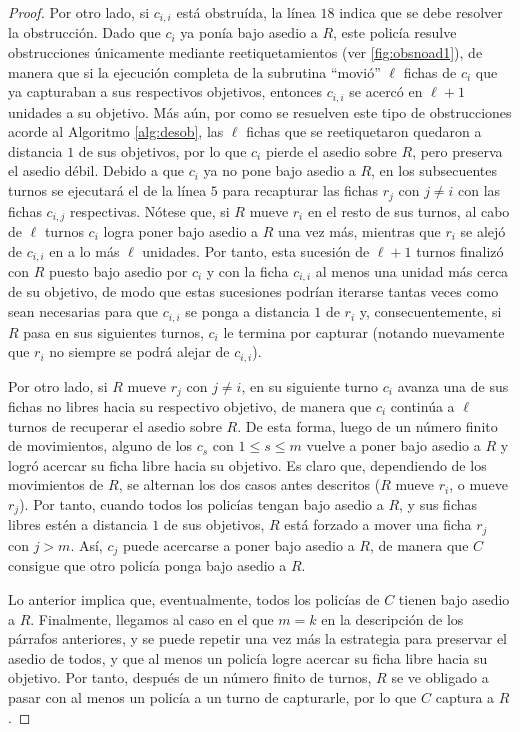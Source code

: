 \begin{proof}
    Por otro lado, si $c_{i,i}$ est\'a obstru\'ida, la l\'inea $18$ indica que
    se debe resolver la obstrucci\'on. Dado que $c_i$ ya pon\'ia bajo asedio a
    $R$, este polic\'ia resulve obstrucciones \'unicamente mediante
    reetiquetamientos (ver \cref{fig:obsnoad1}), de manera que si la ejecuci\'on
    completa de la subrutina ``movi\'o'' $\ell$ fichas de $c_i$ que ya
    capturaban a sus respectivos objetivos, entonces $c_{i,i}$ se acerc\'o en
    $\ell+1$ unidades a su objetivo. M\'as a\'un, por como se resuelven este
    tipo de obstrucciones acorde al Algoritmo \ref{alg:desob}, las $\ell$ fichas
    que se reetiquetaron quedaron a distancia $1$ de sus objetivos, por lo que
    $c_i$ pierde el asedio sobre $R$, pero preserva el asedio d\'ebil. Debido a
    que $c_i$ ya no pone bajo asedio a $R$, en los subsecuentes turnos se
    ejecutar\'a el  de la l\'inea $5$ para recapturar las fichas $r_j$
    con $j\neq i$ con las fichas $c_{i,j}$ respectivas. N\'otese que, si $R$
    mueve $r_i$ en el resto de sus turnos, al cabo de $\ell$ turnos $c_i$ logra
    poner bajo asedio a $R$ una vez m\'as, mientras que $r_i$ se alej\'o de
    $c_{i,i}$ en a lo m\'as $\ell$ unidades. Por tanto, esta sucesi\'on de
    $\ell+1$ turnos finaliz\'o con $R$ puesto bajo asedio por $c_i$ y con la
    ficha $c_{i,i}$ al menos una unidad m\'as cerca de su objetivo, de modo que
    estas sucesiones podr\'ian iterarse tantas veces como sean necesarias para
    que $c_{i,i}$ se ponga a distancia $1$ de $r_i$ y, consecuentemente, si $R$
    pasa en sus siguientes turnos, $c_i$ le termina por capturar (notando
    nuevamente que $r_i$ no siempre se podr\'a alejar de $c_{i,i}$).

    Por otro lado, si $R$ mueve $r_j$ con $j\neq i$, en su siguiente turno $c_i$
    avanza una de sus fichas no libres hacia su respectivo objetivo, de manera
    que $c_i$ contin\'ua a $\ell$ turnos de recuperar el asedio sobre $R$. De
    esta forma, luego de un n\'umero finito de movimientos, alguno de los $c_s$
    con $1\leq s\leq m$ vuelve a poner bajo asedio a $R$ y logr\'o acercar su
    ficha libre hacia su objetivo.  Es claro que, dependiendo de los movimientos
    de $R$, se alternan los dos casos antes descritos ($R$ mueve $r_i$, o mueve
    $r_j$).  Por tanto, cuando todos los polic\'ias tengan bajo asedio a $R$, y
    sus fichas libres est\'en a distancia $1$ de sus objetivos, $R$ est\'a
    forzado a mover una ficha $r_j$ con $j>m$. As\'i, $c_j$ puede acercarse a
    poner bajo asedio a $R$, de manera que $C$ consigue que otro polic\'ia ponga
    bajo asedio a $R$.

    Lo anterior implica que, eventualmente, todos los polic\'ias de $C$ tienen
    bajo asedio a $R$. Finalmente, llegamos al caso en el que $m = k$ en la
    descripci\'on de los p\'arrafos anteriores, y se puede repetir una vez m\'as
    la estrategia para preservar el asedio de todos, y que al menos un polic\'ia
    logre acercar su ficha libre hacia su objetivo. Por tanto, despu\'es de un
    n\'umero finito de turnos, $R$ se ve obligado a pasar con al menos un
    polic\'ia a un turno de capturarle, por lo que $C$ captura a $R$.

\end{proof}

